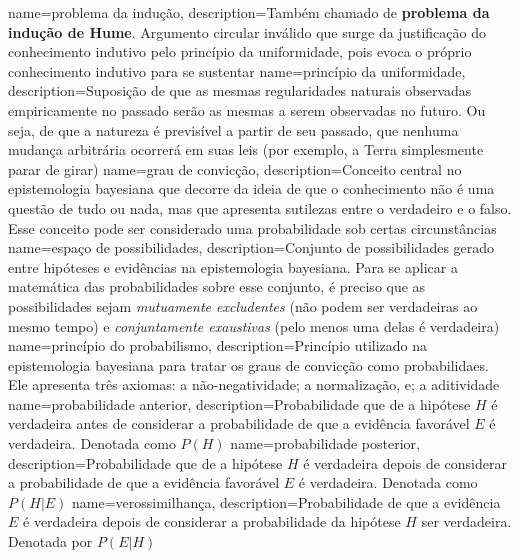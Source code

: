 {
    name=problema da indução,
    description={Também chamado de \textbf{problema da indução de Hume}. Argumento circular inválido que surge da justificação do conhecimento indutivo pelo princípio da uniformidade, pois evoca o próprio conhecimento indutivo para se sustentar}
}
{
    name=princípio da uniformidade,
    description={Suposição de que as mesmas regularidades naturais observadas empiricamente no passado serão as mesmas a serem observadas no futuro. Ou seja, de que a natureza é previsível a partir de seu passado, que nenhuma mudança arbitrária ocorrerá em suas leis (por exemplo, a Terra simplesmente parar de girar)}
}
{
    name=grau de convicção,
    description={Conceito central no epistemologia bayesiana que decorre da ideia de que o conhecimento não é uma questão de tudo ou nada, mas que apresenta sutilezas entre o verdadeiro e o falso. Esse conceito pode ser considerado uma probabilidade sob certas circunstâncias}
}
{
    name=espaço de possibilidades,
    description={Conjunto de possibilidades gerado entre hipóteses e evidências na epistemologia bayesiana. Para se aplicar a matemática das probabilidades sobre esse conjunto, é preciso que as possibilidades sejam \textit{mutuamente excludentes} (não podem ser verdadeiras ao mesmo tempo) e \textit{conjuntamente exaustivas} (pelo menos uma delas é verdadeira)}
}
{
    name=princípio do probabilismo,
    description={Princípio utilizado na epistemologia bayesiana para tratar os graus de convicção como probabilidaes. Ele apresenta três axiomas: a não-negatividade; a normalização, e; a aditividade}
}
{
    name=probabilidade anterior,
    description={Probabilidade que de a hipótese $H$ é verdadeira antes de considerar a probabilidade de que a evidência favorável $E$ é verdadeira. Denotada como $P(H)$}
}
{
    name=probabilidade posterior,
    description={Probabilidade que de a hipótese $H$ é verdadeira depois de considerar a probabilidade de que a evidência favorável $E$ é verdadeira. Denotada como $P(H | E)$}
}
{
    name=verossimilhança,
    description={Probabilidade de que a evidência $E$ é verdadeira depois de considerar a probabilidade da hipótese $H$ ser verdadeira. Denotada por $P(E | H)$}
}
